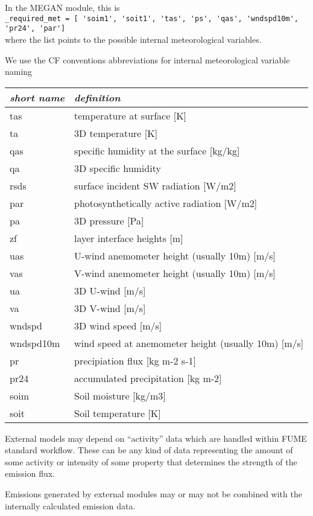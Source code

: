 \documentclass[a4paper,11pt]{article}
\begin{document}
In the MEGAN module, this is\\ \verb|_required_met = [ 'soim1', 'soit1', 'tas', 'ps', 'qas', 'wndspd10m', 'pr24', 'par']|\\ where the list points to the
possible internal meteorological variables.

We use the CF conventions abbreviations for internal meteorological variable naming 
\\

\begin{tabular}{ll}
{\em short name} & {\em definition}\\\hline
tas & temperature at surface {[}K{]} \\
ta & 3D temperature {[}K{]} \\
qas & specific humidity at the surface {[}kg/kg{]}\\
qa & 3D specific humidity\\
rsds & surface incident SW radiation {[}W/m2{]}\\
par & photosynthetically active radiation {[}W/m2{]} \\
pa & 3D pressure {[}Pa{]} \\
zf & layer interface heights {[}m{]} \\
uas & U-wind anemometer height (usually 10m) {[}m/s{]} \\
vas & V-wind anemometer height (usually 10m) {[}m/s{]} \\
ua & 3D U-wind {[}m/s{]} \\
va & 3D V-wind {[}m/s{]} \\
wndspd & 3D wind speed {[}m/s{]}\\
wndspd10m & wind speed at anemometer height (usually 10m) {[}m/s{]} \\
pr & precipiation flux {[}kg m-2 s-1{]} \\
pr24 & accumulated precipitation {[}kg m-2{]} \\
soim & Soil moisture {[}kg/m3{]}\\
soit & Soil temperature {[}K{]}\\\hline
\end{tabular}

External models may depend on ``activity'' data which are handled within FUME standard workflow. These can be any kind of data representing the amount of some activity or intensity of some property that determines the strength of the emission flux.

Emissions generated by external modules may or may not be combined with the internally calculated emission data.
\end{document}
